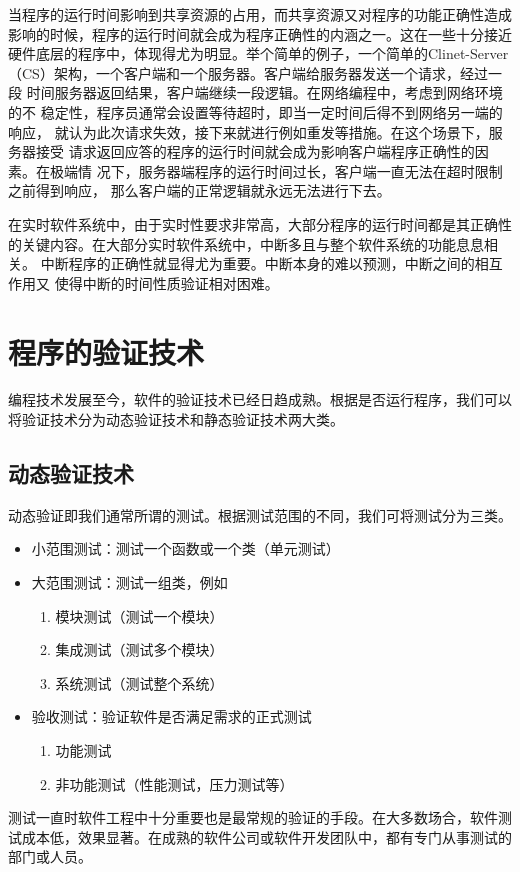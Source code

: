 当程序的运行时间影响到共享资源的占用，而共享资源又对程序的功能正确性造成
影响的时候，程序的运行时间就会成为程序正确性的内涵之一。这在一些十分接近
硬件底层的程序中，体现得尤为明显。举个简单的例子，一个简单的Clinet-Server
（CS）架构，一个客户端和一个服务器。客户端给服务器发送一个请求，经过一段
时间服务器返回结果，客户端继续一段逻辑。在网络编程中，考虑到网络环境的不
稳定性，程序员通常会设置等待超时，即当一定时间后得不到网络另一端的响应，
就认为此次请求失效，接下来就进行例如重发等措施。在这个场景下，服务器接受
请求返回应答的程序的运行时间就会成为影响客户端程序正确性的因素。在极端情
况下，服务器端程序的运行时间过长，客户端一直无法在超时限制之前得到响应，
那么客户端的正常逻辑就永远无法进行下去。

在实时软件系统中，由于实时性要求非常高，大部分程序的运行时间都是其正确性
的关键内容。在大部分实时软件系统中，中断多且与整个软件系统的功能息息相关。
中断程序的正确性就显得尤为重要。中断本身的难以预测，中断之间的相互作用又
使得中断的时间性质验证相对困难。

\section{程序的验证技术}
\label{sec:verification}
编程技术发展至今，软件的验证技术已经日趋成熟。根据是否运行程序，我们可以
将验证技术分为动态验证技术和静态验证技术两大类。

\subsection{动态验证技术}
\label{subsec:dynamic}
动态验证即我们通常所谓的测试。根据测试范围的不同，我们可将测试分为三类。
\cite{SWEBOK}
\begin{itemize}
	\item 小范围测试：测试一个函数或一个类（单元测试）
	\item 大范围测试：测试一组类，例如
	\begin{enumerate}[(1)]
		\item 模块测试（测试一个模块）
		\item 集成测试（测试多个模块）
		\item 系统测试（测试整个系统）
	\end{enumerate}
	\item 验收测试：验证软件是否满足需求的正式测试
	\begin{enumerate}[(1)]
		\item 功能测试
		\item 非功能测试（性能测试，压力测试等）
	\end{enumerate}		
\end{itemize}
测试一直时软件工程中十分重要也是最常规的验证的手段。在大多数场合，软件测
试成本低，效果显著。在成熟的软件公司或软件开发团队中，都有专门从事测试的
部门或人员。

